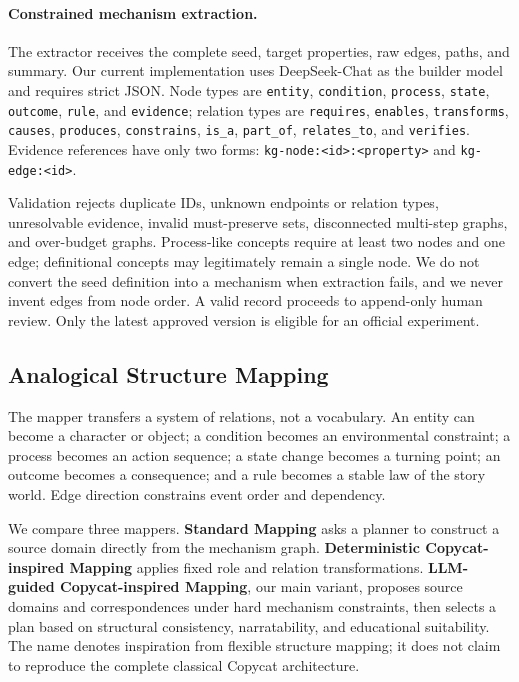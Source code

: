 \documentclass[letterpaper]{article} %
\begin{document}
\paragraph{Constrained mechanism extraction.}
The extractor receives the complete seed, target properties, raw edges, paths, and summary. Our current implementation uses DeepSeek-Chat as the builder model and requires strict JSON. Node types are \texttt{entity}, \texttt{condition}, \texttt{process}, \texttt{state}, \texttt{outcome}, \texttt{rule}, and \texttt{evidence}; relation types are \texttt{requires}, \texttt{enables}, \texttt{transforms}, \texttt{causes}, \texttt{produces}, \texttt{constrains}, \texttt{is\_a}, \texttt{part\_of}, \texttt{relates\_to}, and \texttt{verifies}. Evidence references have only two forms: \texttt{kg-node:<id>:<property>} and \texttt{kg-edge:<id>}.

Validation rejects duplicate IDs, unknown endpoints or relation types, unresolvable evidence, invalid must-preserve sets, disconnected multi-step graphs, and over-budget graphs. Process-like concepts require at least two nodes and one edge; definitional concepts may legitimately remain a single node. We do not convert the seed definition into a mechanism when extraction fails, and we never invent edges from node order. A valid record proceeds to append-only human review. Only the latest approved version is eligible for an official experiment.

\subsection{Analogical Structure Mapping}

The mapper transfers a system of relations, not a vocabulary. An entity can become a character or object; a condition becomes an environmental constraint; a process becomes an action sequence; a state change becomes a turning point; an outcome becomes a consequence; and a rule becomes a stable law of the story world. Edge direction constrains event order and dependency.

We compare three mappers. \textbf{Standard Mapping} asks a planner to construct a source domain directly from the mechanism graph. \textbf{Deterministic Copycat-inspired Mapping} applies fixed role and relation transformations. \textbf{LLM-guided Copycat-inspired Mapping}, our main variant, proposes source domains and correspondences under hard mechanism constraints, then selects a plan based on structural consistency, narratability, and educational suitability. The name denotes inspiration from flexible structure mapping; it does not claim to reproduce the complete classical Copycat architecture.
\end{document}
